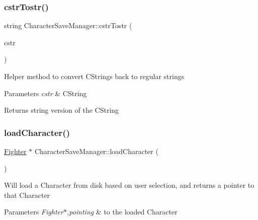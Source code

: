 \subsubsection{\texorpdfstring{cstr\+Tostr()}{cstrTostr()}}
{\footnotesize\ttfamily string Character\+Save\+Manager\+::cstr\+Tostr (\begin{DoxyParamCaption}\item[{C\+String \&}]{cstr }\end{DoxyParamCaption})\hspace{0.3cm}{\ttfamily [static]}}

Helper method to convert C\+Strings back to regular strings 
\begin{DoxyParams}{Parameters}
{\em cstr} & C\+String \\
\hline
\end{DoxyParams}
\begin{DoxyReturn}{Returns}
string version of the C\+String 
\end{DoxyReturn}
\hypertarget{class_character_save_manager_a44105e8553b29cd7e37f3eec6f1a7ce7}{}\label{class_character_save_manager_a44105e8553b29cd7e37f3eec6f1a7ce7} 
\subsubsection{\texorpdfstring{load\+Character()}{loadCharacter()}}
{\footnotesize\ttfamily \hyperlink{class_fighter}{Fighter} $\ast$ Character\+Save\+Manager\+::load\+Character (\begin{DoxyParamCaption}{ }\end{DoxyParamCaption})\hspace{0.3cm}{\ttfamily [static]}}

Will load a Character from disk based on user selection, and returns a pointer to that Character 
\begin{DoxyParams}{Parameters}
{\em Fighter$\ast$,pointing} & to the loaded Character \\
\hline
\end{DoxyParams}
\hypertarget{class_character_save_manager_af8ee3fecc5c19f1f61f98e9132a26b5f}{}\label{class_character_save_manager_af8ee3fecc5c19f1f61f98e9132a26b5f} 
